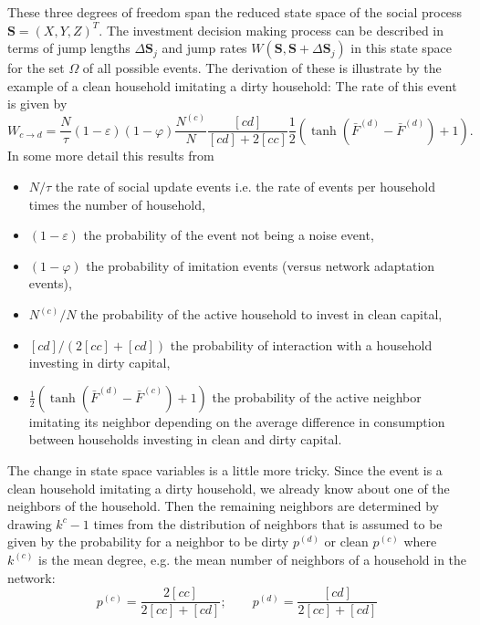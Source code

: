 These three degrees of freedom span the reduced state space of the social process $\mathbf{S} = (X, Y, Z)^T$. The investment decision making process can be described in terms of jump lengths $\Delta \mathbf{S}_j$ and jump rates $W(\mathbf{S},\mathbf{S} + \Delta \mathbf{S}_j)$ in this state space for the set $\Omega$ of all possible events.
The derivation of these is illustrate by the example of a clean household imitating a dirty household: The rate of this event is given by
\begin{equation}
	W_{c \rightarrow d} = \frac{N}{\tau} (1-\varepsilon) (1 - \varphi) \frac{N^{(c)}}{N}\frac{[cd]}{[cd] + 2 [cc]}\frac{1}{2}\left( \tanh(\bar{F}^{(d)} - \bar{F}^{(d)}) + 1 \right).
	\label{cdswitchingprob}
\end{equation}
In some more detail this results from
\begin{itemize}
	\item $N/\tau$ the rate of social update events i.e. the rate of events per household times the number of household,
	\item $(1-\varepsilon)$ the probability of the event not being a noise event,
	\item $(1-\varphi)$ the probability of imitation events (versus network adaptation events),
	\item $N^{(c)}/N$ the probability of the active household to invest in clean capital,
	\item $[cd]/(2[cc] + [cd])$ the probability of interaction with a household investing in dirty capital,
	\item $\frac{1}{2}\left( \tanh(\bar{F}^{(d)} - \bar{F}^{(c)}) + 1 \right)$ the probability of the active neighbor imitating its neighbor depending on the average difference in consumption between households investing in clean and dirty capital.
\end{itemize}
The change in state space variables is a little more tricky. Since the event is a clean household imitating a dirty household, we already know about one of the neighbors of the household. Then the remaining neighbors are determined by drawing $k^{c} - 1$ times from the distribution of neighbors that is assumed to be given by the probability for a neighbor to be dirty $p^{(d)}$ or clean $p^{(c)}$ where $k^{(c)}$ is the mean degree, e.g. the mean number of neighbors of a household in the network:
\begin{equation}
	p^{(c)} = \frac{2 [cc]}{2[cc] + [cd]}; \qquad p^{(d)} = \frac{[cd]}{2[cc] + [cd]}
	\label{neighbordist}
\end{equation}

